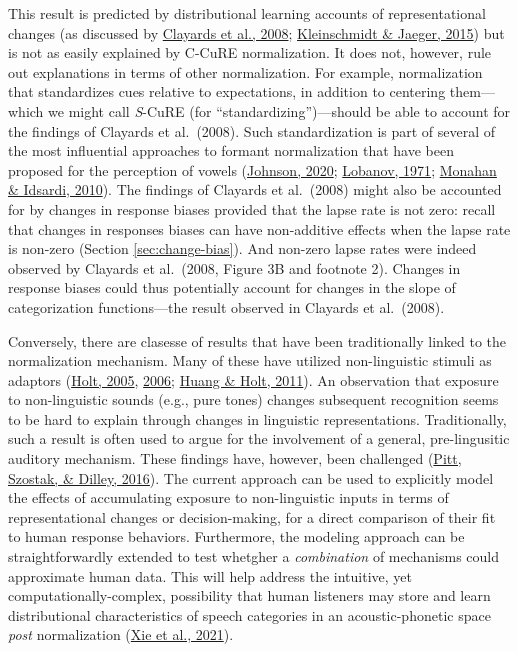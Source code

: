 \documentclass[
  11pt,
  english,
  man,floatsintext]{apa6}
\begin{document}
This result is predicted by distributional learning accounts of representational changes (as discussed by \protect\hyperlink{ref-clayards2008}{Clayards et al., 2008}; \protect\hyperlink{ref-kleinschmidt-jaeger2015}{Kleinschmidt \& Jaeger, 2015}) but is not as easily explained by C-CuRE normalization. It does not, however, rule out explanations in terms of other normalization. For example, normalization that standardizes cues relative to expectations, in addition to centering them---which we might call \emph{S}-CuRE (for ``standardizing'')---should be able to account for the findings of Clayards et al.~(2008). Such standardization is part of several of the most influential approaches to formant normalization that have been proposed for the perception of vowels (\protect\hyperlink{ref-johnson2020}{Johnson, 2020}; \protect\hyperlink{ref-lobanov1971}{Lobanov, 1971}; \protect\hyperlink{ref-monahan-idsardi2010}{Monahan \& Idsardi, 2010}). The findings of Clayards et al.~(2008) might also be accounted for by changes in response biases provided that the lapse rate is not zero: recall that changes in responses biases can have non-additive effects when the lapse rate is non-zero (Section \ref{sec:change-bias}). And non-zero lapse rates were indeed observed by Clayards et al.~(2008, Figure 3B and footnote 2). Changes in response biases could thus potentially account for changes in the slope of categorization functions---the result observed in Clayards et al.~(2008).

Conversely, there are clasesse of results that have been traditionally linked to the normalization mechanism. Many of these have utilized non-linguistic stimuli as adaptors (\protect\hyperlink{ref-holt2005}{Holt, 2005}, \protect\hyperlink{ref-holt2006}{2006}; \protect\hyperlink{ref-huang-holt2011}{Huang \& Holt, 2011}). An observation that exposure to non-linguistic sounds (e.g., pure tones) changes subsequent recognition seems to be hard to explain through changes in linguistic representations. Traditionally, such a result is often used to argue for the involvement of a general, pre-lingusitic auditory mechanism. These findings have, however, been challenged (\protect\hyperlink{ref-pitt2016}{Pitt, Szostak, \& Dilley, 2016}). The current approach can be used to explicitly model the effects of accumulating exposure to non-linguistic inputs in terms of representational changes or decision-making, for a direct comparison of their fit to human response behaviors. Furthermore, the modeling approach can be straightforwardly extended to test whetgher a \emph{combination} of mechanisms could approximate human data. This will help address the intuitive, yet computationally-complex, possibility that human listeners may store and learn distributional characteristics of speech categories in an acoustic-phonetic space \emph{post} normalization (\protect\hyperlink{ref-xie2021cognition}{Xie et al., 2021}).
\end{document}
